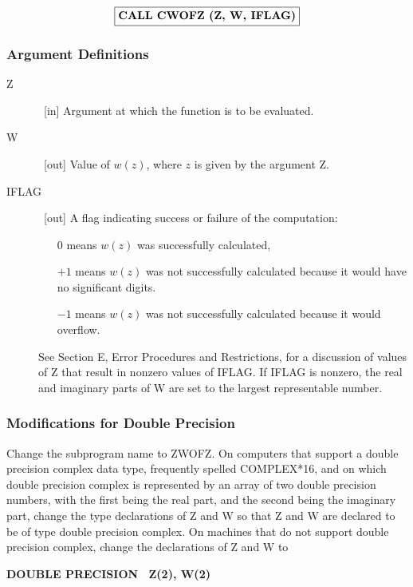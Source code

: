 \documentclass[twoside]{MATH77}
\begin{document}
$$
\fbox{{\bf CALL CWOFZ (Z, W, IFLAG)}}
$$

\subsubsection{Argument Definitions}

\begin{description}
\item[Z]  \ [in] Argument at which the function is to be evaluated.

\item[W]  \ [out] Value of $w(z)$, where $z$ is given by the argument Z.

\item[IFLAG]  \ [out] A flag indicating success or failure of the
computation:

\begin{itemize}
\item[0]  means $w(z)$ was successfully calculated,

\item[$+1$]  means $w(z)$ was not successfully calculated because it would
have no significant digits.

\item[$-1$]  means $w(z)$ was not successfully calculated because it would
overflow.
\end{itemize}

See Section E, Error Procedures and Restrictions, for a discussion of values
of Z that result in nonzero values of IFLAG. If IFLAG is nonzero, the real
and imaginary parts of W are set to the largest representable number.
\end{description}

\subsubsection{Modifications for Double Precision}

Change the subprogram name to ZWOFZ. On computers that support a double
precision complex data type, frequently spelled COMPLEX*16, and on which
double precision complex is represented by an array of two double precision
numbers, with the first being the real part, and the second being the
imaginary part, change the type declarations of Z and W so that Z and W are
declared to be of type double precision complex. On machines that do not
support double precision complex, change the declarations of Z and W to

{\bf DOUBLE PRECISION \ Z(2), W(2)}
\end{document}
